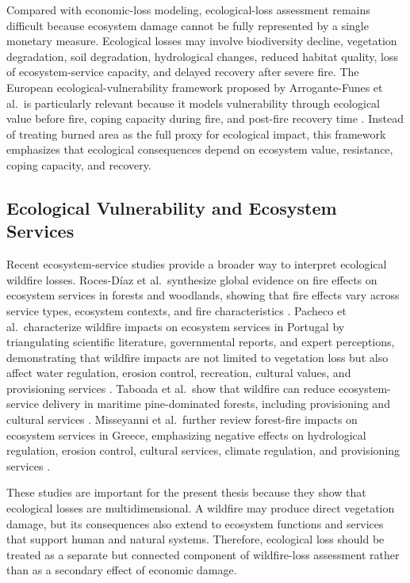 Compared with economic-loss modeling, ecological-loss assessment remains difficult because ecosystem damage cannot be fully represented by a single monetary measure. Ecological losses may involve biodiversity decline, vegetation degradation, soil degradation, hydrological changes, reduced habitat quality, loss of ecosystem-service capacity, and delayed recovery after severe fire. The European ecological-vulnerability framework proposed by Arrogante-Funes et al.\ is particularly relevant because it models vulnerability through ecological value before fire, coping capacity during fire, and post-fire recovery time \citep{arrogantefunes2024ecological}. Instead of treating burned area as the full proxy for ecological impact, this framework emphasizes that ecological consequences depend on ecosystem value, resistance, coping capacity, and recovery.

\subsection{Ecological Vulnerability and Ecosystem Services}

Recent ecosystem-service studies provide a broader way to interpret ecological wildfire losses. Roces-D\'iaz et al.\ synthesize global evidence on fire effects on ecosystem services in forests and woodlands, showing that fire effects vary across service types, ecosystem contexts, and fire characteristics \citep{rocesdiaz2022ecosystemservices}. Pacheco et al.\ characterize wildfire impacts on ecosystem services in Portugal by triangulating scientific literature, governmental reports, and expert perceptions, demonstrating that wildfire impacts are not limited to vegetation loss but also affect water regulation, erosion control, recreation, cultural values, and provisioning services \citep{pacheco2023ecosystemservices}. Taboada et al.\ show that wildfire can reduce ecosystem-service delivery in maritime pine-dominated forests, including provisioning and cultural services \citep{taboada2021ecosystemdelivery}. Misseyanni et al.\ further review forest-fire impacts on ecosystem services in Greece, emphasizing negative effects on hydrological regulation, erosion control, cultural services, climate regulation, and provisioning services \citep{misseyanni2025ecosystemservices}.

These studies are important for the present thesis because they show that ecological losses are multidimensional. A wildfire may produce direct vegetation damage, but its consequences also extend to ecosystem functions and services that support human and natural systems. Therefore, ecological loss should be treated as a separate but connected component of wildfire-loss assessment rather than as a secondary effect of economic damage.

